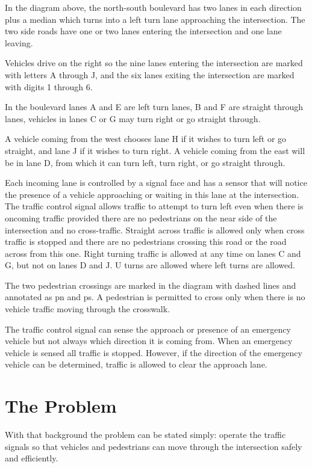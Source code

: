 \documentclass[letterpaper,twoside]{article}
\begin{document}
In the diagram above, the north-south boulevard has two lanes in each
direction plus a median which turns into a left turn lane approaching
the intersection.  The two side roads have one or two lanes entering
the intersection and one lane leaving.

Vehicles drive on the right so the nine lanes entering the intersection are
marked with letters A through J, and the six lanes exiting the intersection are
marked with digits 1 through 6.

In the boulevard lanes A and E are left turn lanes, B and F are straight
through lanes, vehicles in lanes C or G may turn right or go straight through.

A vehicle coming from the west chooses lane H if it wishes to turn left
or go straight, and lane J if it wishes to turn right.
A vehicle coming from the east will be in lane D, from which it can turn
left, turn right, or go straight through.

Each incoming lane is controlled by a signal face and has a sensor that will
notice the presence of a vehicle approaching or waiting in this lane
at the intersection.
The traffic control signal allows traffic to attempt to turn left even
when there is oncoming traffic provided there are no pedestrians on the near
side of the intersection and no cross-traffic.
Straight across traffic is allowed only when
cross traffic is stopped and there are no pedestrians crossing this road
or the road across from this one.
Right turning traffic is allowed at any time on lanes C and G, but not
on lanes D and J.  U turns are allowed where left turns are allowed.

The two pedestrian crossings are marked in the diagram with dashed lines
and annotated as pn and ps.
A pedestrian is permitted to cross only when there is no vehicle traffic
moving through the crosswalk.

The traffic control signal can sense the approach or presence of an emergency
vehicle but not always which direction it is coming from.
When an emergency vehicle is sensed all traffic is stopped.
However, if the direction of the emergency vehicle can be determined,
traffic is allowed to clear the approach lane.

\section{The Problem}
With that background the problem can be stated simply: operate the traffic
signals so that vehicles and pedestrians can move through
the intersection safely and efficiently.
\end{document}
